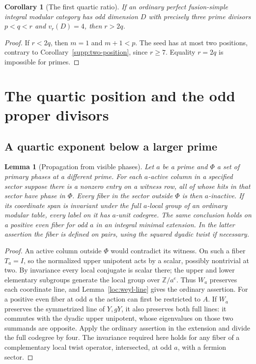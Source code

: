 \documentclass[11pt,a4paper]{article}
\numberwithin{equation}{section}
\newtheorem{lemma}[theorem]{Lemma}
\newtheorem{corollary}[theorem]{Corollary}
\begin{document}
\begin{corollary}[The first quartic ratio]\label{supp:first-ratio}
If an ordinary perfect fusion-simple integral modular category has
odd dimension $D$ with precisely three prime divisors $p<q<r$
and $v_r(D)=4$, then
$r>2q$.
\end{corollary}
\begin{proof}
If $r<2q$, then $m=1$ and $m+1<p$. The seed has at most
two positions, contrary to Corollary~\ref{supp:two-position},
since $r\ge7$. Equality $r=2q$ is impossible for primes.
\end{proof}

\section{The quartic position and the odd proper divisors}\label{sec:odd-faces}

\subsection{A quartic exponent below a larger prime}

\begin{lemma}[Propagation from visible phases]\label{red:visible-fiber}
Let $a$ be a prime and $\Phi$ a set of primary phases at a different prime. For each $a$-active column in a specified sector suppose there is a nonzero entry on a witness row, all of whose hits in that sector have phase in $\Phi$. Every fiber in the sector outside $\Phi$ is then $a$-inactive. If its coordinate span is invariant under the full $a$-local group of an ordinary modular table, every label on it has $a$-unit codegree. The same conclusion holds on a positive even fiber for odd $a$ in an integral minimal extension. In the latter assertion the fiber is defined on pairs, using the squared dyadic twist if necessary.
\end{lemma}
\begin{proof}
An active column outside $\Phi$ would contradict its witness. On such a fiber $T_a=I$, so the normalized upper unipotent acts by a scalar, possibly nontrivial at two. By invariance every local conjugate is scalar there; the upper and lower elementary subgroups generate the local group over $\mathbb Z/a^e$. Thus $W_a$ preserves each coordinate line, and Lemma~\ref{loc:weyl-line} gives the ordinary assertion. For a positive even fiber at odd $a$ the action can first be restricted to $A$. If $W_a$ preserves the symmetrized line of $Y,gY$, it also preserves both full lines: it commutes with the dyadic upper unipotent, whose eigenvalues on those two summands are opposite. Apply the ordinary assertion in the extension and divide the full codegree by four. The invariance required here holds for any fiber of a complementary local twist operator, intersected, at odd $a$, with a fermion sector.
\end{proof}
\end{document}
